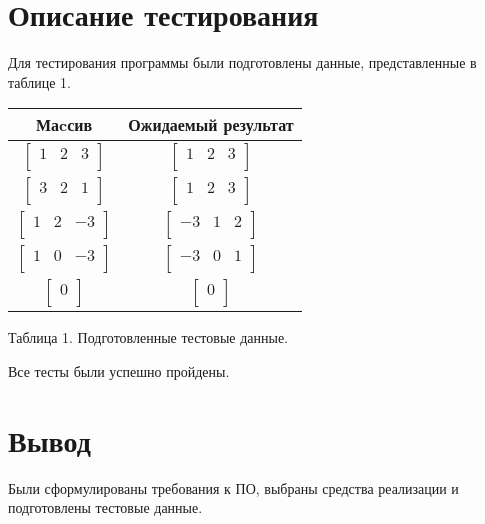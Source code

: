 \section{Описание тестирования}
Для тестирования программы были подготовлены данные, представленные в таблице 1.
	\begin{center}
		\begin{tabular}{  | c | c | }
			\hline
			\textbf{Маcсив}& \textbf{Ожидаемый результат} \\ \hline
			$\begin{bmatrix} 
   			1&2&3 \\
			\end{bmatrix}$ & 
			$\begin{bmatrix} 
   			1&2&3 \\
			\end{bmatrix}$ \\
			\hline
			
			$\begin{bmatrix} 
   			3&2&1 \\
			\end{bmatrix}$ & 
			$\begin{bmatrix} 
   			1&2&3 \\
			\end{bmatrix}$ \\
			\hline
			
			$\begin{bmatrix} 
   			1&2&-3 \\
			\end{bmatrix}$ & 
			$\begin{bmatrix} 
   			-3&1&2 \\
			\end{bmatrix}$ \\
			\hline
			
			$\begin{bmatrix} 
   			1&0&-3 \\
			\end{bmatrix}$ & 
			$\begin{bmatrix} 
   			-3&0&1 \\
			\end{bmatrix}$ \\
			\hline
			
			$\begin{bmatrix} 
   			0 \\
			\end{bmatrix}$ & 
			$\begin{bmatrix} 
   			0 \\
			\end{bmatrix}$ \\
			\hline
		\end{tabular}
		
		\hfill
		
		Таблица 1.
		Подготовленные тестовые данные.  
	\end{center}
	
Все тесты были успешно пройдены.
\section{Вывод}

Были сформулированы требования к ПО, выбраны средства реализации и подготовлены тестовые данные.
